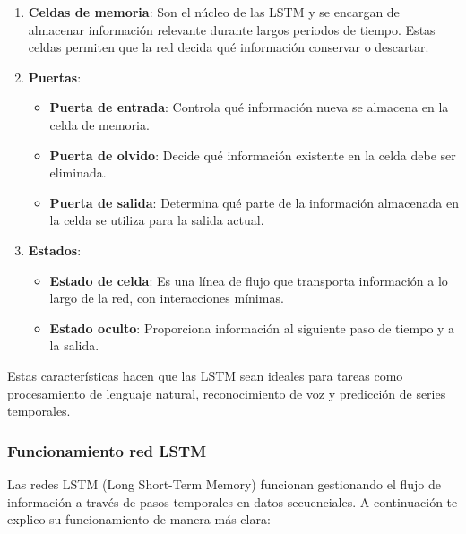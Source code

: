 \documentclass[11pt]{article}
\begin{document}
\begin{enumerate}
\item \textbf{\textbf{Celdas de memoria}}: Son el núcleo de las LSTM y se encargan de
almacenar información relevante durante largos periodos de
tiempo. Estas celdas permiten que la red decida qué información
conservar o descartar.

\item \textbf{\textbf{Puertas}}:
\begin{itemize}
\item \textbf{\textbf{Puerta de entrada}}: Controla qué información nueva se almacena
en la celda de memoria.
\item \textbf{\textbf{Puerta de olvido}}: Decide qué información existente en la
celda debe ser eliminada.
\item \textbf{\textbf{Puerta de salida}}: Determina qué parte de la información
almacenada en la celda se utiliza para la salida actual.
\end{itemize}

\item \textbf{\textbf{Estados}}:
\begin{itemize}
\item \textbf{\textbf{Estado de celda}}: Es una línea de flujo que transporta
información a lo largo de la red, con interacciones mínimas.
\item \textbf{\textbf{Estado oculto}}: Proporciona información al siguiente paso de
tiempo y a la salida.
\end{itemize}
\end{enumerate}

Estas características hacen que las LSTM sean ideales para tareas como
procesamiento de lenguaje natural, reconocimiento de voz y predicción
de series temporales.

\subsubsection{Funcionamiento red LSTM}
\label{sec:orge671825}
Las redes LSTM (Long Short-Term Memory) funcionan gestionando el flujo
de información a través de pasos temporales en datos secuenciales. A
continuación te explico su funcionamiento de manera más clara:
\end{document}
